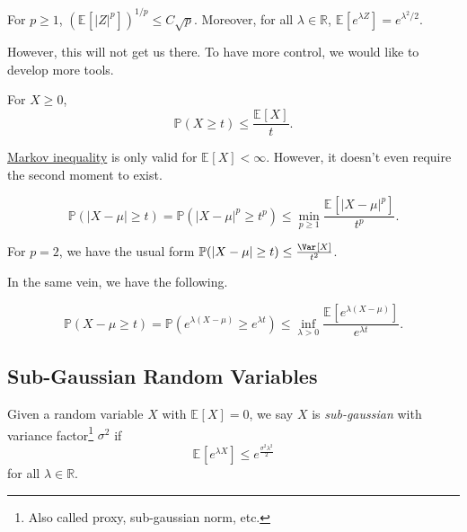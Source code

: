 \begin{remark}
	For \(p \geq 1\), \(\left( \mathbb{E}_{}\left[\vert Z \vert ^p \right]  \right) ^{1 / p} \leq C \sqrt{p} \). Moreover, for all \(\lambda \in \mathbb{R} \), \(\mathbb{E}_{}\left[e^{\lambda Z} \right] = e^{\lambda ^2 / 2}\).
\end{remark}

However, this will not get us there. To have more control, we would like to develop more tools.

\begin{lemma}\label{lma:Markov-inequality}
	For \(X \geq 0\),
	\[
		\mathbb{P} (X \geq t) \leq \frac{\mathbb{E}_{}\left[X \right] }{t}.
	\]
\end{lemma}

\begin{note}
	\hyperref[lma:Markov-inequality]{Markov inequality} is only valid for \(\mathbb{E}_{}\left[X \right] < \infty \). However, it doesn't even require the second moment to exist.
\end{note}

\begin{lemma}\label{lma:Chebyshev-inequality}
	\[
		\mathbb{P} (\vert X - \mu  \vert \geq t ) = \mathbb{P} (\vert X - \mu  \vert^p \geq t ^p) \leq \min _{p \geq 1} \frac{\mathbb{E}_{}\left[\vert X-\mu  \vert^p \right] }{t^p}.
	\]
\end{lemma}

\begin{remark}
	For \(p = 2\), we have the usual form \(\mathbb{P} (\vert X - \mu  \vert \geq t) \leq \frac{\Var_{}\left[X \right] }{t^2}\).
\end{remark}

In the same vein, we have the following.

\begin{corollary}
	\[
		\mathbb{P} (X - \mu \geq t) = \mathbb{P} (e^{\lambda (X - \mu ) } \geq e^{\lambda t}) \leq \inf _{\lambda > 0} \frac{\mathbb{E}_{}\left[e^{\lambda (X - \mu )} \right] }{e^{\lambda t}}.
	\]
\end{corollary}

\subsection{Sub-Gaussian Random Variables}
\begin{definition}\label{def:sub-gaussian}
	Given a random variable \(X\) with \(\mathbb{E}_{}\left[X \right] = 0\), we say \(X\) is \emph{sub-gaussian} with variance factor\footnote{Also called proxy, sub-gaussian norm, etc.} \(\sigma ^2\) if
	\[
		\mathbb{E}_{}\left[e^{\lambda X} \right] \leq e^{\frac{\sigma ^2 \lambda ^2}{2}}
	\]
	for all \(\lambda \in \mathbb{R} \).
\end{definition}

